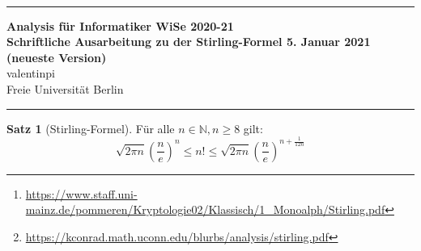 \documentclass[10pt,fleqn]{article}
\theoremstyle{definition}
\newtheorem{theorem}{Satz}
\theoremstyle{remark}
\newcommand{\Authors}{valentinpi}
\begin{document}
\vspace*{-12ex}
\phantom{}\\
\noindent\rule{\textwidth}{0.1pt}
\large \textbf{Analysis für Informatiker \hfill WiSe 2020-21} \vspace*{0.25cm}\\
\normalsize \textbf{Schriftliche Ausarbeitung zu der Stirling-Formel \hfill 5. Januar 2021 { (neueste Version)}}\\
\Authors\\
Freie Universität Berlin\\
\noindent\rule{\textwidth}{0.1pt}

\begin{abstract}
    \noindent Ziel dieser Ausarbeitung ist es, die in der Vorlesung unbewiesene Formel von \textsc{Stirling} zu beweisen, und dabei weitgehend die nötigen Hilfsformeln mit unseren bisherigen Kenntnissen selbst herzuleiten. Insbesondere versuchen wir hier ein Verständnis für recht erweiterte Werkzeuge zu entwickeln, trotz dass wir diese nicht beweisen werden. Genutzt wird eine weitere Ausarbeitung der Uni Mainz.\footnote{\url{https://www.staff.uni-mainz.de/pommeren/Kryptologie02/Klassisch/1_Monoalph/Stirling.pdf}}\\
    
    \noindent Die in der Komplexitätsanalyze genutzte Formel von James Stirling hat eine reiche Geschichte. Ein Ansatz hier für Quellen ist das Dokument \emph{Methodus Differentialis} von 1730. In anderen Papern zu diesem Thema kann man aber deutlich mehr erfahren. Wen dies interessiert: Diese\footnote{\url{https://kconrad.math.uconn.edu/blurbs/analysis/stirling.pdf}} Ausarbeitung von Keith Conrad ist sehr empfehlenswert. Etwa hat \textsc{DeMoivre} bei der Entdeckung seinen Anteil gehabt. Ausserdem wird darüber geredet, wie Stirling auf die Rolle der Konstante \(\pi\) in der Formel kam.
\end{abstract}

\begin{theorem}[Stirling-Formel] Für alle \(n \in \mathbb{N}, n \geq 8\) gilt:
    \[
        \sqrt{2 \pi n} \left(\frac{n}{e}\right)^n \leq n! \leq \sqrt{2 \pi n} \left(\frac{n}{e}\right)^{n+\frac{1}{12n}}
    \]
\end{theorem}
\end{document}
